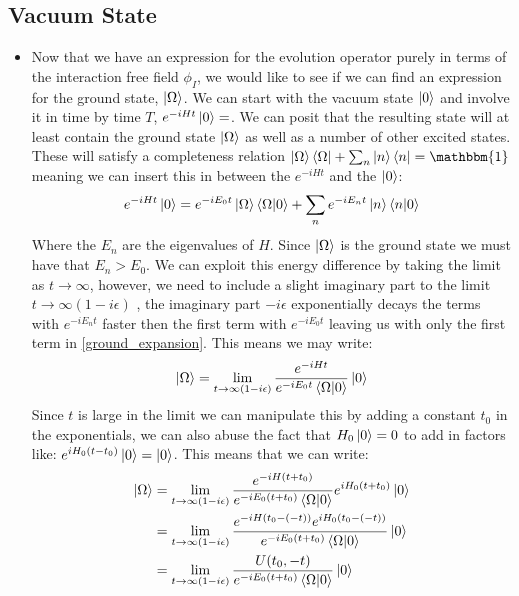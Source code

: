\documentclass[11pt]{article}
\numberwithin{equation}{section}
\begin{document}
\subsection{Vacuum State} %
\label{sub:vacuum_state}
\begin{itemize}
  \item Now that we have an expression for the evolution operator purely in terms of the interaction free field $\phi_I$, we would like to see if we can find an expression for the ground state, $\ket{\Omega}$. We can start with the vacuum state $\ket{0}$ and involve it in time by time $T$, $e^{-iHt}\ket{0}=$. We can posit that the resulting state will at least contain the ground state $\ket{\Omega}$ as well as a number of other excited states. These will satisfy a completeness relation $\ket{\Omega}\bra{\Omega} + \sum_{n}\ket{n}\bra{n} = \mathbbm{1}$ meaning we can insert this in between the $e^{-iHt}$ and the $\ket{0}$:
  \begin{align}
  \label{ground_expansion}
    e^{-iHt}\ket{0}=e^{-iE_0t}\ket{\Omega}\braket{\Omega|0} + \sum_{n}e^{-iE_nt}\ket{n}\braket{n|0}
  \end{align}
  Where the $E_n$ are the eigenvalues of $H$. Since $\ket{\Omega}$ is the ground state we must have that $E_n>E_0$. We can exploit this energy difference by taking the limit as $t \rightarrow \infty$, however, we need to include a slight imaginary part to the limit $t \rightarrow \infty(1-i\epsilon)$ , the imaginary part $-i\epsilon$ exponentially decays the terms with $e^{-iE_nt}$ faster then the first term with $e^{-iE_0t}$  leaving us with only the first term in \ref{ground_expansion}. This means we may write:
  \begin{align*}
    \ket{\Omega} = \lim_{t\rightarrow\infty(1-i\epsilon)}\frac{e^{-iHt}}{e^{-iE_0t}\braket{\Omega|0}}\ket{0}
  \end{align*}
  Since $t$ is large in the limit we can manipulate this by adding a constant $t_0$ in the exponentials, we can also abuse the fact that $H_0\ket{0} = 0$ to add in factors like: $e^{iH_0(t-t_0)}\ket{0} = \ket{0}$. This means that we can write:
  \begin{align*}
    \ket{\Omega} & = \lim_{t\rightarrow\infty(1-i\epsilon)}\frac{e^{-iH(t+t_0)}}{e^{-iE_0(t+t_0)}\braket{\Omega|0}}e^{iH_0(t+t_0)}\ket{0} \\
    & =  \lim_{t\rightarrow\infty(1-i\epsilon)}\frac{e^{-iH(t_0-(-t))}e^{iH_0(t_0-(-t))}}{e^{-iE_0(t+t_0)}\braket{\Omega|0}}\ket{0} \\
    & = \lim_{t\rightarrow\infty(1-i\epsilon)}\frac{U(t_0,-t)}{e^{-iE_0(t+t_0)}\braket{\Omega|0}}\ket{0}

\end{align*}
\end{itemize}
\end{document}
